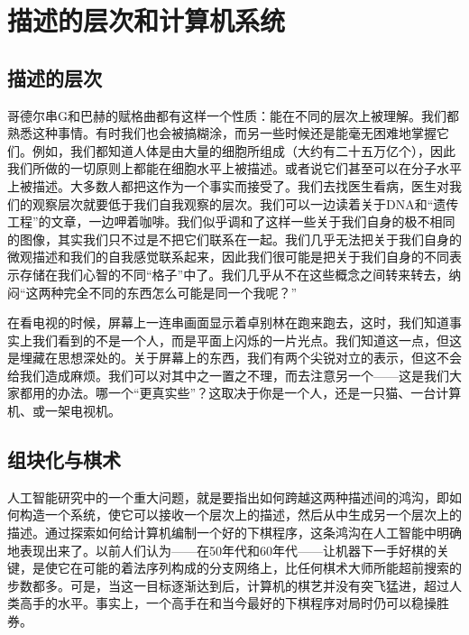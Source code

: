 
\chapter{描述的层次和计算机系统}

\section{描述的层次}

哥德尔串G和巴赫的赋格曲都有这样一个性质：能在不同的层次上被理解。我们都熟悉这种事情。有时我们也会被搞糊涂，而另一些时候还是能毫无困难地掌握它们。例如，我们都知道人体是由大量的细胞所组成（大约有二十五万亿个），因此我们所做的一切原则上都能在细胞水平上被描述。或者说它们甚至可以在分子水平上被描述。大多数人都把这作为一个事实而接受了。我们去找医生看病，医生对我们的观察层次就要低于我们自我观察的层次。我们可以一边读着关于DNA和“遗传工程”的文章，一边呷着咖啡。我们似乎调和了这样一些关于我们自身的极不相同的图像，其实我们只不过是不把它们联系在一起。我们几乎无法把关于我们自身的微观描述和我们的自我感觉联系起来，因此我们很可能是把关于我们自身的不同表示存储在我们心智的不同“格子”中了。我们几乎从不在这些概念之间转来转去，纳闷“这两种完全不同的东西怎么可能是同一个我呢？”

在看电视的时候，屏幕上一连串画面显示着卓别林在跑来跑去，这时，我们知道事实上我们看到的不是一个人，而是平面上闪烁的一片光点。我们知道这一点，但这是埋藏在思想深处的。关于屏幕上的东西，我们有两个尖锐对立的表示，但这不会给我们造成麻烦。我们可以对其中之一置之不理，而去注意另一个——这是我们大家都用的办法。哪一个“更真实些”？这取决于你是一个人，还是一只猫、一台计算机、或一架电视机。

\section{组块化与棋术}

人工智能研究中的一个重大问题，就是要指出如何跨越这两种描述间的鸿沟，即如何构造一个系统，使它可以接收一个层次上的描述，然后从中生成另一个层次上的描述。通过探索如何给计算机编制一个好的下棋程序，这条鸿沟在人工智能中明确地表现出来了。以前人们认为——在50年代和60年代——让机器下一手好棋的关键，是使它在可能的着法序列构成的分支网络上，比任何棋术大师所能超前搜索的步数都多。可是，当这一目标逐渐达到后，计算机的棋艺并没有突飞猛进，超过人类高手的水平。事实上，一个高手在和当今最好的下棋程序对局时仍可以稳操胜券。

